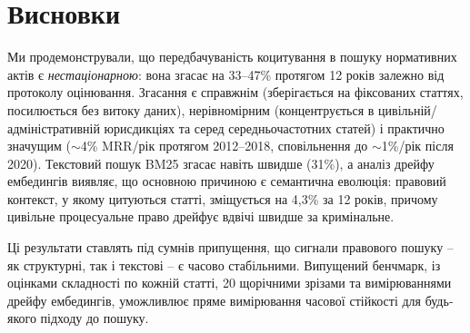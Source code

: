 \documentclass[11pt]{article}
\begin{document}
\section{Висновки}
\label{sec:conclusion}

Ми продемонстрували, що передбачуваність коцитування в пошуку нормативних актів є \emph{нестаціонарною}: вона згасає на 33--47\% протягом 12 років залежно від протоколу оцінювання.
Згасання є справжнім (зберігається на фіксованих статтях, посилюється без витоку даних), нерівномірним (концентрується в цивільній/адміністративній юрисдикціях та серед середньочастотних статей) і практично значущим ($\sim$4\% MRR/рік протягом 2012--2018, сповільнення до $\sim$1\%/рік після 2020).
Текстовий пошук BM25 згасає навіть швидше (31\%), а аналіз дрейфу ембедингів виявляє, що основною причиною є семантична еволюція: правовий контекст, у якому цитуються статті, зміщується на 4{,}3\% за 12 років, причому цивільне процесуальне право дрейфує вдвічі швидше за кримінальне.

Ці результати ставлять під сумнів припущення, що сигнали правового пошуку -- як структурні, так і текстові -- є часово стабільними.
Випущений бенчмарк, із оцінками складності по кожній статті, 20 щорічними зрізами та вимірюваннями дрейфу ембедингів, уможливлює пряме вимірювання часової стійкості для будь-якого підходу до пошуку.



\end{document}
